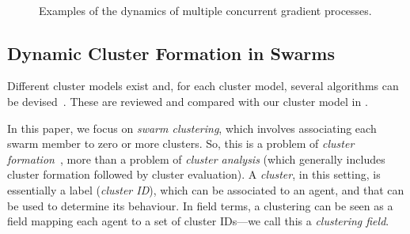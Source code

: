 \begin{figure}
%
\\
%
%
\caption{Examples of the dynamics of multiple concurrent gradient processes.}
\label{fig:spawn-dynamics}
\end{figure}


\subsection{ Dynamic Cluster Formation in Swarms}
\label{s:background-clustering}

Different cluster models exist
 and, for each cluster model, several algorithms can be devised~\cite{DBLP:journals/sigkdd/Estivill-Castro02}.
%
These are reviewed and compared with our cluster model in .

In this paper, we focus on \emph{swarm clustering},
 which involves associating each swarm member
 to zero or more clusters.
%
So, this is a problem of \emph{cluster formation}~\cite{DBLP:journals/tie/GeHZ18},
 more than a problem of \emph{cluster analysis} (which generally includes cluster formation followed by cluster evaluation).
%
A \emph{cluster}, in this setting,
 is essentially a label (\emph{cluster ID}),
 which can be associated to an agent,
 and that can be used to determine its behaviour.
%
In field terms,
 a clustering can be seen as a field
 mapping each agent to
 a set of cluster IDs---we call this a \emph{clustering field}.

